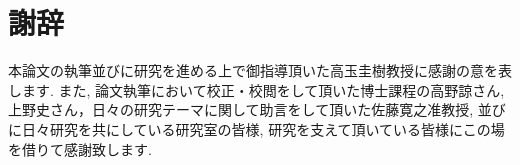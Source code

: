 \documentclass[a4j,11pt]{jarticle}
\begin{document}
\clearpage
\pagestyle{plain}
\section*{謝辞}
本論文の執筆並びに研究を進める上で御指導頂いた高玉圭樹教授に感謝の意を表します. 
また, 論文執筆において校正・校閲をして頂いた博士課程の高野諒さん,上野史さん，日々の研究テーマに関して助言をして頂いた佐藤寛之准教授, 並びに日々研究を共にしている研究室の皆様, 研究を支えて頂いている皆様にこの場を借りて感謝致します. 

\clearpage
\newpage
{}


\end{document}
